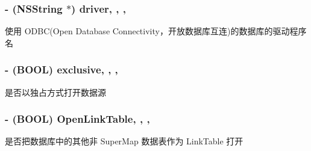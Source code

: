 \hypertarget{interface_datasource_connection_info_aff2ec2a3b3bd1f02095f5a33f3b731a6}{
\subsubsection[{driver}]{\setlength{\rightskip}{0pt plus 5cm}-\/ (N\-S\-String $\ast$) driver\hspace{0.3cm}{\ttfamily [read]}, {\ttfamily [write]}, {\ttfamily [atomic]}, {\ttfamily [copy]}}}\label{interface_datasource_connection_info_aff2ec2a3b3bd1f02095f5a33f3b731a6}


使用 O\-D\-B\-C(Open Database Connectivity，开放数据库互连)的数据库的驱动程序名 

\hypertarget{interface_datasource_connection_info_a15eaa8dfeb1d855e6fec2f9e6ff9820c}{
\subsubsection[{exclusive}]{\setlength{\rightskip}{0pt plus 5cm}-\/ (B\-O\-O\-L) exclusive\hspace{0.3cm}{\ttfamily [read]}, {\ttfamily [write]}, {\ttfamily [atomic]}, {\ttfamily [assign]}}}\label{interface_datasource_connection_info_a15eaa8dfeb1d855e6fec2f9e6ff9820c}


是否以独占方式打开数据源 

\hypertarget{interface_datasource_connection_info_aee6b9e9896d111f150c391a42ff95d16}{
\subsubsection[{Open\-Link\-Table}]{\setlength{\rightskip}{0pt plus 5cm}-\/ (B\-O\-O\-L) Open\-Link\-Table\hspace{0.3cm}{\ttfamily [read]}, {\ttfamily [write]}, {\ttfamily [atomic]}, {\ttfamily [assign]}}}\label{interface_datasource_connection_info_aee6b9e9896d111f150c391a42ff95d16}


是否把数据库中的其他非 Super\-Map 数据表作为 Link\-Table 打开 

